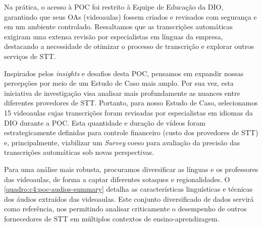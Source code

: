 Na prática, o acesso à POC foi restrito à Equipe de Educação da DIO, garantindo que seus OAs (videoaulas) fossem criados e revisados com segurança e em um ambiente controlado. Ressaltamos que as transcrições automáticas exigiram uma extensa revisão por especialistas em línguas da empresa, destacando a necessidade de otimizar o processo de transcrição e explorar outros serviços de STT.

Inspirados pelos \textit{insights} e desafios desta POC, pensamos em expandir nossas percepções por meio de um Estudo de Caso mais amplo. Por sua vez, esta iniciativa de investigação visa analisar mais profundamente as nuances entre diferentes provedores de STT. Portanto, para nosso Estudo de Caso, selecionamos 15 videoaulas cujas transcrições foram revisadas por especialistas em idiomas da DIO durante a POC. Esta quantidade e duração de vídeos foram estrategicamente definidas para controle financeiro (custo dos provedores de STT) e, principalmente, viabilizar um \textit{Survey} coeso para avaliação da precisão das transcrições automáticas sob novas perspectivas.

Para uma análise mais robusta, procuramos diversificar as línguas e os professores das videoaulas, de forma a captar diferentes sotaques e regionalidades. O \autoref{quadro:c4:poc-audios-summary} detalha as características linguísticas e técnicas dos áudios extraídos das videoaulas. Este conjunto diversificado de dados servirá como referência, nos permitindo analisar criticamente o desempenho de outros fornecedores de STT em múltiplos contextos de ensino-aprendizagem.


